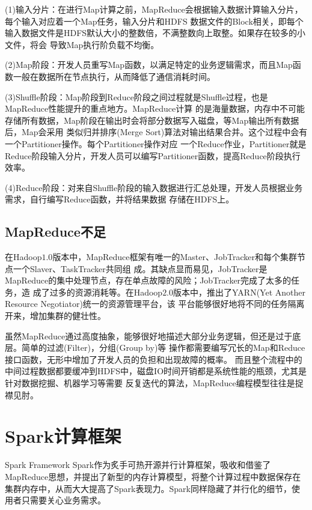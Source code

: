 (1)输入分片：在进行Map计算之前，MapReduce会根据输入数据计算输入分片，每个输入对应着一个Map任务，输入分片和HDFS
数据文件的Block相关，即每个输入数据文件是HDFS默认大小的整数倍，不满整数向上取整。如果存在较多的小文件，将会
导致Map执行阶负载不均衡。

(2)Map阶段：开发人员重写Map函数，以满足特定的业务逻辑需求，而且Map函数一般在数据所在节点执行，从而降低了通信消耗时间。

(3)Shuffle阶段：Map阶段到Reduce阶段之间过程就是Shuffle过程，也是MapReduce性能提升的重点地方。MapReduce计算
的是海量数据，内存中不可能存储所有数据，Map阶段在输出时会将部分数据写入磁盘，等Map输出所有数据后，Map会采用
类似归并排序(Merge Sort)算法对输出结果合并。这个过程中会有一个Partitioner操作。每个Partitioner操作对应
一个Reduce作业，Partitioner就是Reduce阶段输入分片，开发人员可以编写Partitioner函数，提高Reduce阶段执行效率。

(4)Reduce阶段：对来自Shuffle阶段的输入数据进行汇总处理，开发人员根据业务需求，自行编写Reduce函数，并将结果数据
存储在HDFS上。
\subsection{MapReduce不足}
在Hadoop$1.0$版本中，MapReduce框架有唯一的Master、JobTracker和每个集群节点一个Slaver、TaskTracker共同组
成。其缺点显而易见，JobTracker是MapReduce的集中处理节点，存在单点故障的风险；JobTracker完成了太多的任务，造
成了过多的资源消耗等。在Hadoop$2.0$版本中，推出了YARN(Yet Another Resource Negotiator)统一的资源管理平台，该
平台能够很好地将不同的任务隔离开来，增加集群的健壮性。

虽然MapReduce通过高度抽象，能够很好地描述大部分业务逻辑，但还是过于底层。简单的过滤(Filter)，分组(Group by)等
操作都需要编写冗长的Map和Reduce接口函数，无形中增加了开发人员的负担和出现故障的概率\cite{Grolinger2014Challenges}。
而且整个流程中的中间过程数据都要缓冲到HDFS中，磁盘IO时间开销都是系统性能的瓶颈，尤其是针对数据挖掘、机器学习等需要
反复迭代的算法，MapReduce编程模型往往是捉襟见肘。

\section{Spark计算框架}{Spark Framework}
Spark作为炙手可热开源并行计算框架，吸收和借鉴了MapReduce思想，并提出了新型的内存计算模型，将整个计算过程中数据保存在
集群内存中，从而大大提高了Spark表现力。Spark同样隐藏了并行化的细节，使用者只需要关心业务需求。
